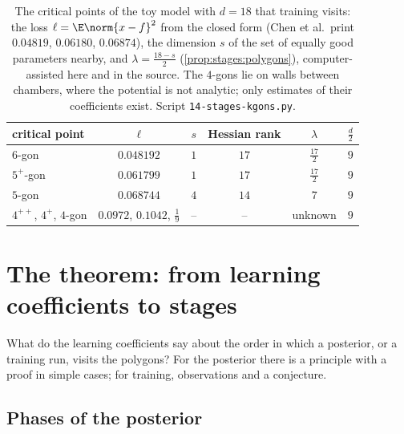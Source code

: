 \begin{refsection}
\begin{table}[t]
\centering\small
\begin{tabular}{@{}lccccc@{}}
\toprule
critical point & $\ell$ & $s$ & Hessian rank & $\lambda$ & $\frac d2$ \\
\midrule
$6$-gon & $0.048192$ & $1$ & $17$ & $\frac{17}2$ & $9$ \\
$5^+$-gon & $0.061799$ & $1$ & $17$ & $\frac{17}2$ & $9$ \\
$5$-gon & $0.068744$ & $4$ & $14$ & $7$ & $9$ \\
$4^{++}$, $4^+$, $4$-gon & $0.0972$, $0.1042$, $\frac19$ & -- & -- & unknown & $9$ \\
\bottomrule
\end{tabular}
\caption{The critical points of the toy model with $d=18$ that training visits: the loss $\ell=\E\norm{x-f}^2$ from the closed form (Chen et al.\ print $0.04819$, $0.06180$, $0.06874$), the dimension $s$ of the set of equally good parameters nearby, and $\lambda=\frac{18-s}2$ (\cref{prop:stages:polygons}), computer-assisted here and in the source. The $4$-gons lie on walls between chambers, where the potential is not analytic; only estimates of their coefficients exist. Script \texttt{14-stages-kgons.py}.}\label{tab:stages:status}
\end{table}

\section{The theorem: from learning coefficients to stages}\label{sec:stages:transitions}

What do the learning coefficients say about the order in which a posterior, or a training run, visits the polygons? For the posterior there is a principle with a proof in simple cases; for training, observations and a conjecture.

\subsection*{Phases of the posterior}


\end{refsection}
